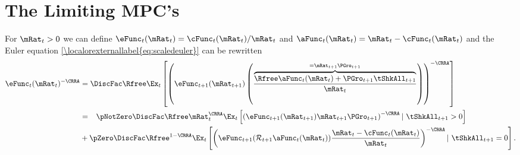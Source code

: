 \documentclass[\econtexRoot/BufferStockTheory.tex]{subfiles}
\begin{document}
\hypertarget{The-Limiting-MPCs}{}
\section{The Limiting MPC's}
\label{sec:MPCLimits}
For $\mRat_{t}>0$ we can define $\eFunc_{t}(\mRat_{t})=\cFunc_{t}(\mRat_{t})/\mRat_{t}$
and $\aFunc_{t}(\mRat_{t})=\mRat_{t}-\cFunc_{t}(\mRat_{t})$
and the Euler equation \eqref{\localorexternallabel{eq:scaledeuler}} can be rewritten
\begin{align}
 \eFunc_{t}(\mRat_{t})^{-\CRRA}  & = \DiscFac \Rfree \Ex_{t}\left[\left(\eFunc_{t+1}({\mRat}_{t+1})\left(\frac{\overbrace{\Rfree \aFunc_{t}(\mRat_{t})+{\PGro}_{t+1}{\tShkAll}_{t+1}}^{=\mRat_{t+1}\PGro_{t+1}}}{\mRat_{t}}\right)\right)^{-\CRRA }\right] \label{eq:eFuncEuler}
\\  & = \phantom{ + }\pNotZero \DiscFac \Rfree \mRat_{t}^{\CRRA} \Ex_{t}\left[ \left(\eFunc_{t+1}(\mRat_{t+1}) \mRat_{t+1}\PGro_{t+1}\right)^{-\CRRA} |~ \tShkAll_{t+1}>0 \right] \notag
\\ &  + \pZero  \DiscFac \Rfree^{1-\CRRA} \Ex_{t}\left[\left(\eFunc_{t+1}(\mathcal{R}_{t+1}\aFunc_{t}(\mRat_{t}))\frac{\mRat_t-\cFunc_{t}(\mRat_{t})}{\mRat_{t}}\right)^{-\CRRA} |~ \tShkAll_{t+1} = 0 \right]   .
\end{align}
\end{document}
